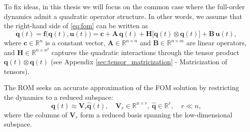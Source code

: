 To fix ideas, in this thesis we will focus on the common case where the full-order dynamics admit a quadratic operator structure.  In other words, we assume that the right-hand side of \eqref{eq:fom} can be written as\\
\begin{equation}
  \label{eq:fompoly}
  \dot{\mathbf{q}}(t)
  = \mathbf{f}\bigl(\mathbf{q}(t),\mathbf{u}(t)\bigr)
  = \mathbf{c}
    + \mathbf{A}\,\mathbf{q}(t)
    + \mathbf{H}\bigl[\mathbf{q}(t)\otimes\mathbf{q}(t)\bigr]
    + \mathbf{B}\,\mathbf{u}(t),
\end{equation}
where $\mathbf{c}\in\mathbb{R}^n$ is a constant vector, $\mathbf{A}\in\mathbb{R}^{n\times n}$ and $\mathbf{B}\in\mathbb{R}^{n\times m}$ are linear operators, and $\mathbf{H}\in\mathbb{R}^{n\times n^2}$ captures the quadratic interactions through the tensor product $\mathbf{q}(t) \otimes \mathbf{q}(t)$ (see Appendix \ref{sec:tensor_matricization} - Matricization of tensors).


The ROM seeks an accurate approximation of the FOM solution by restricting the dynamics to a reduced subspace:\\
\begin{equation}
    \mathbf{q}(t) \approx \mathbf{V}_r\hat{\mathbf{q}}(t), \quad \mathbf{V}_r \in \mathbb{R}^{n \times r},~\hat{\mathbf{q}}\in \mathbb{R}^{r},\quad r \ll n,
    \label{eq:subspace}
\end{equation}
where the columns of $\mathbf{V}_r$ form a reduced basis spanning the low-dimensional subspace.

